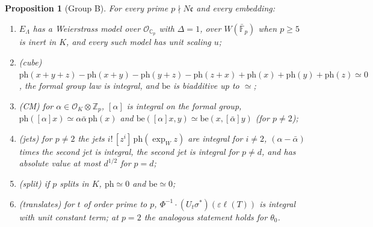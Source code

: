 \documentclass[11pt]{article}
\newtheorem{proposition}[theorem]{Proposition}
\theoremstyle{remark}
\begin{document}
\begin{proposition}[Group B]\label{prop:f4b}
For every prime $p\nmid N\mathfrak c$ and every embedding:
\begin{enumerate}[label=(\roman*),nosep]
\item $E_\Lambda$ has a Weierstrass model over $\mathcal O_{\mathbb C_p}$ with $\Delta=1$, over $W(\bar{\mathbb F}_p)$ when $p\ge5$ is inert in $K$, and every such model has unit scaling $u$;
\item (cube) $\mathrm{ph}(x+y+z)-\mathrm{ph}(x+y)-\mathrm{ph}(y+z)-\mathrm{ph}(z+x)+\mathrm{ph}(x)+\mathrm{ph}(y)+\mathrm{ph}(z)\simeq0$, the formal group law is integral, and $\mathrm{be}$ is biadditive up to $\simeq$;
\item (CM) for $\alpha\in\mathcal O_K\otimes\mathbb Z_p$, $[\alpha]$ is integral on the formal group, $\mathrm{ph}([\alpha]x)\simeq\alpha\bar\alpha\,\mathrm{ph}(x)$ and $\mathrm{be}([\alpha]x,y)\simeq\mathrm{be}(x,[\bar\alpha]y)$ (for $p\ne2$);
\item (jets) for $p\ne2$ the jets $i!\,[z^i]\,\mathrm{ph}(\exp_W z)$ are integral for $i\ne2$, $(\alpha-\bar\alpha)$ times the second jet is integral, the second jet is integral for $p\ne d$, and has absolute value at most $d^{1/2}$ for $p=d$;
\item (split) if $p$ splits in $K$, $\mathrm{ph}\simeq0$ and $\mathrm{be}\simeq0$;
\item (translates) for $t$ of order prime to $p$, $\Phi^{-1}\cdot(U_t\sigma^*)(\varepsilon\ell(T))$ is integral with unit constant term; at $p=2$ the analogous statement holds for $\theta_0$.
\end{enumerate}
\end{proposition}
\end{document}
